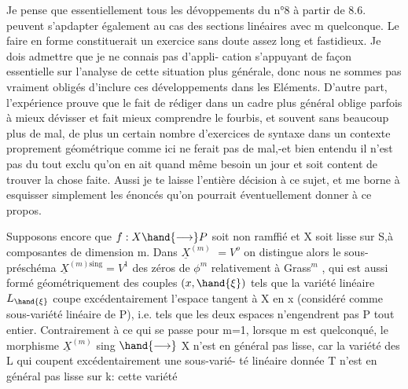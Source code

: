 




Je pense que essentiellement tous les dévoppements du n°8 à
partir de 8.6. peuvent s'apdapter également au cas des sections linéaires avec
m quelconque. Le faire en forme constituerait un exercice sans doute
assez long et fastidieux. Je dois admettre que je ne connais pas d'appli-%
cation s'appuyant de façon essentielle sur l'analyse de cette situation
plus générale, donc nous ne sommes pas vraiment obligés d'inclure ces
développements dans les Eléments. D'autre part, l'expérience prouve que
le fait de rédiger dans un cadre plus général oblige parfois à mieux
dévisser et fait mieux comprendre le fourbis, et souvent sans beaucoup
plus de mal, de plus un certain nombre d'exercices de syntaxe dans un
contexte proprement géométrique comme ici ne ferait pas de mal,-et
bien entendu il n'est pas du tout exclu qu'on en ait quand même besoin
un jour et soit content de trouver la chose faite. Aussi je te laisse
l'entière décision à ce sujet, et me borne à esquisser simplement les
énoncés qu'on pourrait éventuellement donner à ce propos.

Supposons encore que $f:X \hand{\longrightarrow} P$ soit non ramffié et X soit lisse sur
S,à composantes de dimension \hand{$\geq$} m. \hand{(}Dans $\underline{X}^{(m)}$ $=V^o$ on distingue alors le sous-préschéma $\underline{X}^{(m)\mathrm{sing}} = V^1$
des zéros  de $\phi^m$ relativement à Grass$^m$ , qui est aussi formé
géométriquement des couples $(x,\hand{\xi})$ tels que la variété linéaire $L_{\hand{\xi}}$
coupe excédentairement l'espace tangent à X en x (considéré comme
sous-variété linéaire de P), i.e. tels que les deux espaces n'engendrent
pas P tout entier. Contrairement à ce qui se passe pour m=1, lorsque
m est quelconqué, le morphisme $\underline{X}^{(m)}$ sing $\hand{\longrightarrow}$ X n'est en général pas
lisse, car la variété des L qui \hand{(}coupent excédentairement une sous-varié-%
té linéaire donnée T n'est en général pas lisse sur k: cette variété

